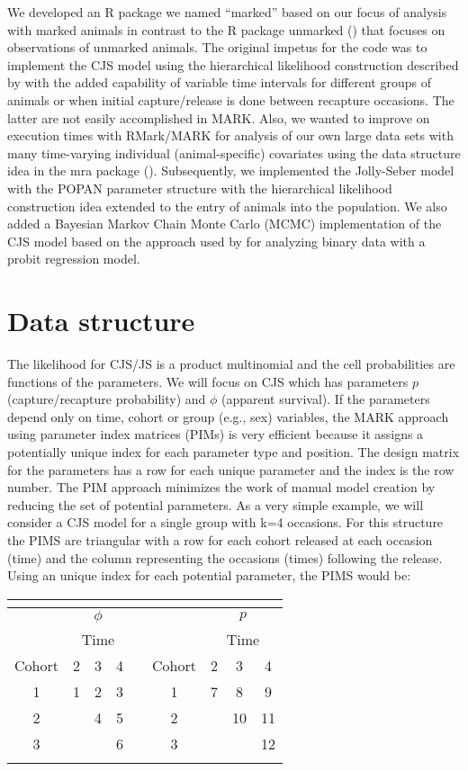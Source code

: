 \documentclass[12pt]{article}
\providecommand{\tabularnewline}{\\}
\begin{document}
We developed an R package we named ``marked'' based on our focus
of analysis with marked animals in contrast to the R package unmarked
(\citealt{Fiske2011}) that focuses on observations of unmarked animals.
The original impetus for the code was to implement the CJS model using
the hierarchical likelihood construction described by \citet{Pledger2003}
with the added capability of variable time intervals for different
groups of animals or when initial capture/release is done between
recapture occasions. The latter are not easily accomplished in MARK.
Also, we wanted to improve on execution times with RMark/MARK for
analysis of our own large data sets with many time-varying individual
(animal-specific) covariates using the data structure idea in the
mra package (\citealt{McDonald2005}). Subsequently, we implemented
the Jolly-Seber model with the \citet{Schwarz1996} POPAN parameter
structure with the hierarchical likelihood construction idea extended
to the entry of animals into the population. We also added a Bayesian
Markov Chain Monte Carlo (MCMC) implementation of the CJS model based
on the approach used by \citet{ALBERT:1993fk} for analyzing binary
data with a probit regression model. 


\section*{Data structure}

The likelihood for CJS/JS is a product multinomial and the cell probabilities
are functions of the parameters. We will focus on CJS which has parameters
$p$ (capture/recapture probability) and $\phi$ (apparent survival).
If the parameters depend only on time, cohort or group (e.g., sex)
variables, the MARK approach using parameter index matrices (PIMs)
is very efficient because it assigns a potentially unique index for
each parameter type and position. The design matrix for the parameters
has a row for each unique parameter and the index is the row number.
The PIM approach minimizes the work of manual model creation by reducing
the set of potential parameters. As a very simple example, we will
consider a CJS model for a single group with k=4 occasions. For this
structure the PIMS are triangular with a row for each cohort released
at each occasion (time) and the column representing the occasions
(times) following the release. Using an unique index for each potential
parameter, the PIMS would be:

\begin{tabular}{ccccccccc}
 &
\multicolumn{3}{c}{} &
 &
 &
\multicolumn{3}{c}{}\tabularnewline
\hline 
 &
\multicolumn{3}{c}{$\phi$ } &
 &
 &
\multicolumn{3}{c}{$p$}\tabularnewline
\hline 
 &
\multicolumn{3}{c}{Time} &
 &
 &
\multicolumn{3}{c}{Time}\tabularnewline
\cline{2-5} \cline{7-9} 
Cohort &
2 &
3 &
4 &
 &
Cohort &
2 &
3 &
4\tabularnewline
\cline{2-4} \cline{7-9} 
1 &
1 &
2 &
3 &
 &
1 &
7 &
8 &
9\tabularnewline
2 &
 &
4 &
5 &
 &
2 &
 &
10 &
11\tabularnewline
3 &
 &
 &
6 &
 &
3 &
 &
 &
12\tabularnewline
\hline 
 &
 &
 &
 &
 &
 &
 &
 &
\tabularnewline
\end{tabular}
\end{document}
